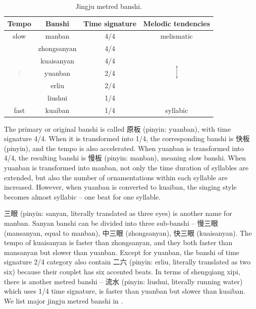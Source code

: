 \begin{table}[ht!]
\centering
\begin{tabular}{cccc}
\toprule
Tempo & Banshi               & Time signature                           & Melodic tendencies  \\
\midrule
slow & manban & 4/4 & melismatic\\
\multirow{5}{*}{\includegraphics[width=0.06\textwidth]{figs/shapes/vertical_double_arrow.png}}& zhongsanyan & 4/4 & \multirow{5}{*}{\includegraphics[width=0.06\textwidth]{figs/shapes/vertical_double_arrow.png}} \\
& kuaisanyan & 4/4 & \\
& yuanban & 2/4 & \\
& erliu & 2/4 & \\
& liushui & 1/4 & \\
fast & kuaiban & 1/4 & syllabic \\
\bottomrule
\end{tabular}
\caption{Jingju metred banshi.}
\label{tab:banshi}
\end{table}

The primary or original banshi is called 原板 (pinyin: yuanban), with time signature 4/4. When it is transformed into 1/4, the corresponding banshi is 快板 (pinyin), and the tempo is also accelerated. When yuanban is transformed into 4/4, the resulting banshi is 慢板 (pinyin: manban), meaning slow banshi. When yuanban is transformed into manban, not only the time duration of syllables are extended, but also the number of ornamentations within each syllable are increased. However, when yuanban is converted to kuaiban, the singing style becomes almost syllabic -- one beat for one syllable. 

三眼 (pinyin: sanyan, literally translated as three eyes) is another name for manban. Sanyan banshi can be divided into three sub-banshi -- 慢三眼 (mansanyan, equal to manban), 中三眼 (zhongsanyan), 快三眼 (kuaisanyan). The tempo of kuaisanyan is faster than zhongsanyan, and they both faster than mansanyan but slower than yuanban. Except for yuanban, the banshi of time signature 2/4 category also contain 二六 (pinyin: erliu, literally translated as two six) because their couplet has six accented beats. In terms of shengqiang xipi, there is another metred banshi -- 流水 (pinyin: liushui, literally running water) which uses 1/4 time signature, is faster than yuanban but slower than kuaiban. We list major jingju metred banshi in .

